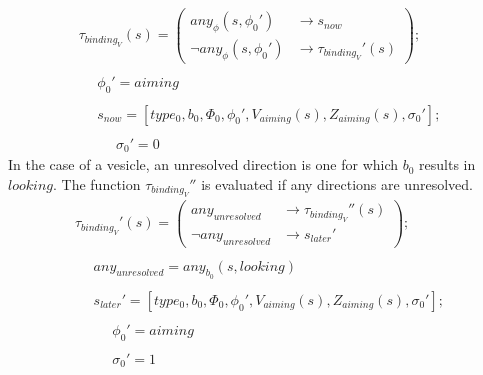 \documentclass{acm_proc_article-sp}
\begin{document}
\begin{displaymath} \begin{array}{l}
\tau_{binding_V}(s) = \left( \begin{array}{ll} any_\phi(s, \phi_0')      & \rightarrow s_{now} \\
                                               \neg any_\phi(s, \phi_0') & \rightarrow \tau_{binding_V}'(s) \end{array} \right); \\
\\
\hspace{16pt} \phi_0' = aiming \\
\\
\hspace{16pt} s_{now} = [type_0, b_0, \Phi_0, \phi_0', V_{aiming}(s), Z_{aiming}(s), \sigma_0']; \\
\\
\hspace{16pt} \hspace{16pt} \sigma_0' = 0 
\end{array} \end{displaymath}
In the case of a vesicle, an unresolved direction is one for
which $b_0$ results in $looking$.  The function $\tau_{binding_V}''$ 
is evaluated if any directions are unresolved.
\begin{displaymath} \begin{array}{l}
\tau_{binding_V}'(s) = \left( \begin{array}{ll} any_{unresolved}      & \rightarrow \tau_{binding_V}''(s) \\
                                                \neg any_{unresolved} & \rightarrow s_{later}' \end{array} \right); \\
\\
\hspace{16pt} any_{unresolved} =  any_{b_0}(s, looking) \\
\\
\hspace{16pt} s_{later}' = [type_0, b_0, \Phi_0, \phi_0', V_{aiming}(s), Z_{aiming}(s), \sigma_0']; \\
\\
\hspace{16pt} \hspace{16pt} \phi_0' = aiming \\
\\
\hspace{16pt} \hspace{16pt} \sigma_0' = 1 
\end{array} \end{displaymath}
\end{document}

